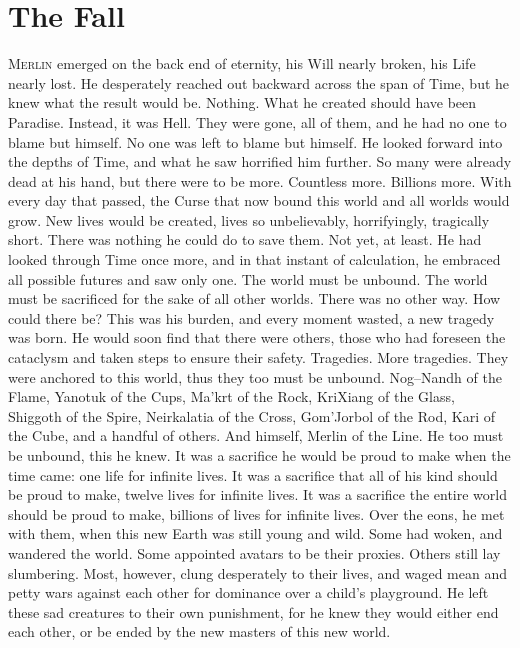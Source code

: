 \chapter{The Fall}


\lettrine{M}{erlin} emerged on the back end of eternity, his Will nearly broken, his Life nearly lost. He desperately reached out backward across the span of Time, but he knew what the result would be. Nothing. What he created should have been Paradise. Instead, it was Hell. They were gone, all of them, and he had no one to blame but himself. No one was left to blame but himself.
\SmallVSpace
He looked forward into the depths of Time, and what he saw horrified him further. So many were already dead at his hand, but there were to be more. Countless more. Billions more. With every day that passed, the Curse that now bound this world and all worlds would grow. New lives would be created, lives so unbelievably, horrifyingly, tragically short. There was nothing he could do to save them.
\SmallVSpace
Not yet, at least.
\SmallVSpace
He had looked through Time once more, and in that instant of calculation, he embraced all possible futures and saw only one. The world must be unbound. The world must be sacrificed for the sake of all other worlds. There was no other way. How could there be? This was his burden, and every moment wasted, a new tragedy was born.
\SomeVSpace
He would soon find that there were others, those who had foreseen the cataclysm and taken steps to ensure their safety. Tragedies. More tragedies. They were anchored to this world, thus they too must be unbound. Nog\mbox{--}Nandh of the Flame, Yanotuk of the Cups, Ma’krt of the Rock, KriXiang of the Glass, Shiggoth of the Spire, Neirkalatia of the Cross, Gom’Jorbol of the Rod, Kari of the Cube, and a handful of others.
\SmallVSpace
And himself, Merlin of the Line. He too must be unbound, this he knew. It was a sacrifice he would be proud to make when the time came: one life for infinite lives. It was a sacrifice that all of his kind should be proud to make, twelve lives for infinite lives. It was a sacrifice the entire world should be proud to make, billions of lives for infinite lives.
\SomeVSpace
Over the eons, he met with them, when this new Earth was still young and wild. Some had woken, and wandered the world. Some appointed avatars to be their proxies. Others still lay slumbering. Most, however, clung desperately to their lives, and waged mean and petty wars against each other for dominance over a child’s playground. He left these sad creatures to their own punishment, for he knew they would either end each other, or be ended by the new masters of this new world.
